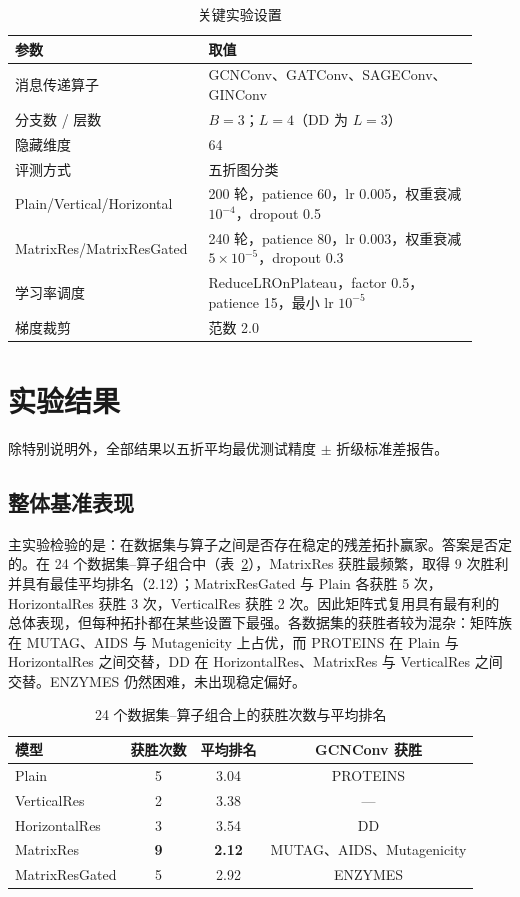 \documentclass[9pt,twocolumn]{extarticle}
\begin{document}
\begin{table}[!t]
\centering
\caption{关键实验设置}
\label{tab:hyperparams-zh}
\footnotesize
\begin{tabular}{@{}p{0.36\linewidth}p{0.56\linewidth}@{}}
\toprule
参数 & 取值 \\
\midrule
消息传递算子 & GCNConv、GATConv、SAGEConv、GINConv \\
分支数 / 层数 & \(B=3\)；\(L=4\)（DD 为 \(L=3\)） \\
隐藏维度 & 64 \\
评测方式 & 五折图分类 \\
Plain/Vertical/Horizontal & 200 轮，patience 60，lr 0.005，权重衰减 \(10^{-4}\)，dropout 0.5 \\
MatrixRes/MatrixResGated & 240 轮，patience 80，lr 0.003，权重衰减 \(5\times10^{-5}\)，dropout 0.3 \\
学习率调度 & ReduceLROnPlateau，factor 0.5，patience 15，最小 lr \(10^{-5}\) \\
梯度裁剪 & 范数 2.0 \\
\bottomrule
\end{tabular}
\end{table}

\section{实验结果}
\label{sec:results-zh}

除特别说明外，全部结果以五折平均最优测试精度 \(\pm\) 折级标准差报告。

\subsection{整体基准表现}

主实验检验的是：在数据集与算子之间是否存在稳定的残差拓扑赢家。答案是否定的。在 24 个数据集--算子组合中（表~\ref{tab:operator_wins-zh}），MatrixRes 获胜最频繁，取得 9 次胜利并具有最佳平均排名（2.12）；MatrixResGated 与 Plain 各获胜 5 次，HorizontalRes 获胜 3 次，VerticalRes 获胜 2 次。因此矩阵式复用具有最有利的总体表现，但每种拓扑都在某些设置下最强。各数据集的获胜者较为混杂：矩阵族在 MUTAG、AIDS 与 Mutagenicity 上占优，而 PROTEINS 在 Plain 与 HorizontalRes 之间交替，DD 在 HorizontalRes、MatrixRes 与 VerticalRes 之间交替。ENZYMES 仍然困难，未出现稳定偏好。

\begin{table}[!t]
\centering
\caption{24 个数据集--算子组合上的获胜次数与平均排名}
\label{tab:operator_wins-zh}
\footnotesize
\begin{tabular}{@{}lccc@{}}
\toprule
模型 & 获胜次数 & 平均排名 & GCNConv 获胜 \\
\midrule
Plain          & 5 & 3.04 & PROTEINS \\
VerticalRes    & 2 & 3.38 & --- \\
HorizontalRes  & 3 & 3.54 & DD \\
MatrixRes      & \textbf{9} & \textbf{2.12} & MUTAG、AIDS、Mutagenicity \\
MatrixResGated & 5 & 2.92 & ENZYMES \\
\bottomrule
\end{tabular}
\end{table}
\end{document}
